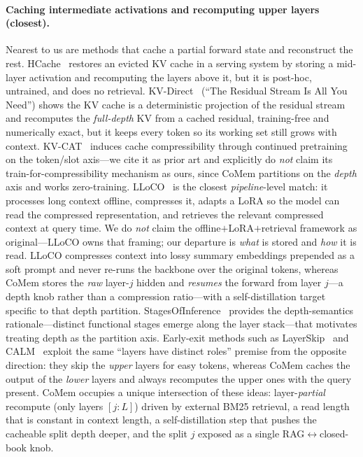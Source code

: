 \paragraph{Caching intermediate activations and recomputing upper layers (closest).}
Nearest to us are methods that cache a partial forward state and reconstruct the
rest. HCache~\citep{hcache} restores an evicted KV cache in a serving system by
storing a mid-layer activation and recomputing the layers above it, but it is
post-hoc, untrained, and does no retrieval. KV-Direct~\citep{kvdirect}
(``The Residual Stream Is All You Need'') shows the KV cache is a deterministic
projection of the residual stream and recomputes the \emph{full-depth} KV from a
cached residual, training-free and numerically exact, but it keeps every token so
its working set still grows with context. KV-CAT~\citep{kvcat} induces cache
compressibility through continued pretraining on the token/slot axis---we cite it
as prior art and explicitly do \emph{not} claim its train-for-compressibility
mechanism as ours, since CoMem partitions on the \emph{depth} axis and works
zero-training. LLoCO~\citep{lloco} is the closest \emph{pipeline}-level match: it
processes long context offline, compresses it, adapts a LoRA so the model can
read the compressed representation, and retrieves the relevant compressed context
at query time. We do \emph{not} claim the offline$+$LoRA$+$retrieval framework as
original---LLoCO owns that framing; our departure is \emph{what} is stored and
\emph{how} it is read. LLoCO compresses context into lossy summary embeddings
prepended as a soft prompt and never re-runs the backbone over the original
tokens, whereas CoMem stores the \emph{raw} layer-$j$ hidden and \emph{resumes}
the forward from layer $j$---a depth knob rather than a compression ratio---with
a self-distillation target specific to that depth partition.
StagesOfInference~\citep{stagesofinference} provides the
depth-semantics rationale---distinct functional stages emerge along the layer
stack---that motivates treating depth as the partition axis. Early-exit methods
such as LayerSkip~\citep{layerskip} and CALM~\citep{calm} exploit the same
``layers have distinct roles'' premise from the opposite direction: they skip the
\emph{upper} layers for easy tokens, whereas CoMem caches the output of the
\emph{lower} layers and always recomputes the upper ones with the query present.
CoMem occupies a
unique intersection of these ideas: layer-\emph{partial} recompute (only
layers $[j{:}L]$) driven by external BM25 retrieval, a read length that is
constant in context length, a self-distillation step that pushes the cacheable
split depth deeper, and the split $j$ exposed as a single RAG$\leftrightarrow$closed-book
knob.

